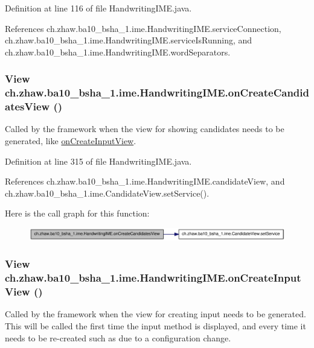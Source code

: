 Definition at line 116 of file HandwritingIME.java.

References ch.zhaw.ba10\_\-bsha\_\-1.ime.HandwritingIME.serviceConnection, ch.zhaw.ba10\_\-bsha\_\-1.ime.HandwritingIME.serviceIsRunning, and ch.zhaw.ba10\_\-bsha\_\-1.ime.HandwritingIME.wordSeparators.\hypertarget{classch_1_1zhaw_1_1ba10__bsha__1_1_1ime_1_1HandwritingIME_a478af9d9f8258613e4e124bdfdd8dc09}{
\subsubsection[{onCreateCandidatesView}]{\setlength{\rightskip}{0pt plus 5cm}View ch.zhaw.ba10\_\-bsha\_\-1.ime.HandwritingIME.onCreateCandidatesView ()}}
\label{classch_1_1zhaw_1_1ba10__bsha__1_1_1ime_1_1HandwritingIME_a478af9d9f8258613e4e124bdfdd8dc09}
Called by the framework when the view for showing candidates needs to be generated, like \hyperlink{classch_1_1zhaw_1_1ba10__bsha__1_1_1ime_1_1HandwritingIME_a920e8e85634fc64519604846302aaa58}{onCreateInputView}. 

Definition at line 315 of file HandwritingIME.java.

References ch.zhaw.ba10\_\-bsha\_\-1.ime.HandwritingIME.candidateView, and ch.zhaw.ba10\_\-bsha\_\-1.ime.CandidateView.setService().

Here is the call graph for this function:\nopagebreak
\begin{figure}[H]
\begin{center}
\leavevmode
\includegraphics[width=323pt]{classch_1_1zhaw_1_1ba10__bsha__1_1_1ime_1_1HandwritingIME_a478af9d9f8258613e4e124bdfdd8dc09_cgraph}
\end{center}
\end{figure}
\hypertarget{classch_1_1zhaw_1_1ba10__bsha__1_1_1ime_1_1HandwritingIME_a920e8e85634fc64519604846302aaa58}{
\subsubsection[{onCreateInputView}]{\setlength{\rightskip}{0pt plus 5cm}View ch.zhaw.ba10\_\-bsha\_\-1.ime.HandwritingIME.onCreateInputView ()}}
\label{classch_1_1zhaw_1_1ba10__bsha__1_1_1ime_1_1HandwritingIME_a920e8e85634fc64519604846302aaa58}
Called by the framework when the view for creating input needs to be generated. This will be called the first time the input method is displayed, and every time it needs to be re-\/created such as due to a configuration change. 

